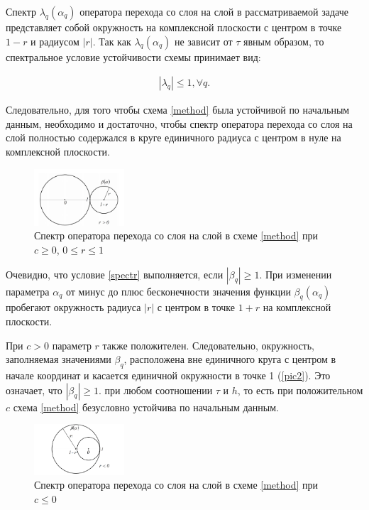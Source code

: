 \documentclass[12pt,a4paper]{scrartcl}
\begin{document}
Спектр $\lambda_q(\alpha_q)$ оператора перехода со слоя на слой в рассматриваемой задаче представляет собой окружность на комплексной плоскости с центром в точке $1 - r$ и радиусом $|r|$. Так как $\lambda_q(\alpha_q)$ не зависит от $\tau$ явным образом, то спектральное условие устойчивости схемы принимает вид:

\begin{align} \label{spectr}
	| \lambda_q | \le 1, \forall q. 
\end{align}

Следовательно, для того чтобы схема \eqref{method} была устойчивой по начальным данным, необходимо и достаточно, чтобы спектр оператора перехода со слоя на слой полностью содержался в круге единичного радиуса с центром в нуле на комплексной плоскости.
	
\begin{figure}[h]
		\centering
		\includegraphics[width=0.3\textwidth]{convect_equation/img/picture2.png}
		\caption{Спектр оператора перехода со слоя на слой в схеме \eqref{method} при $c \ge 0$, $0 \le r \le 1$}
		\label{pic2}
\end{figure}
	
Очевидно, что условие \eqref{spectr} выполняется, если $| \beta_q| \ge 1$. При изменении параметра $\alpha_q$ от минус до плюс бесконечности значения функции $\beta_q(\alpha_q)$ пробегают окружность радиуса $|r|$ с центром в точке $1 + r$ на комплексной плоскости.
	
При $c > 0$ параметр $r$ также положителен. Следовательно, окружность, заполняемая значениями $\beta_q$, расположена вне единичного круга с центром в начале координат и касается единичной окружности в точке 1 (\eqref{pic2}). Это означает, что $| \beta_q| \ge 1$. при любом соотношении $\tau$ и $h$, то есть при положительном $c$ схема \eqref{method} безусловно устойчива по начальным данным.
	
\begin{figure}[h]
		\centering
		\includegraphics[width=0.3\textwidth]{convect_equation/img/picture3.png}
		\caption{Спектр оператора перехода со слоя на слой в схеме \eqref{method} при $c \le 0$}
		\label{pic3}
\end{figure}
	
\end{document}
